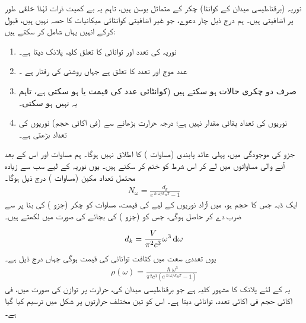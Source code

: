 
نوریہ   (برقناطیسی میدان کے کوانٹا)    چکر   کے متماثل بوسن  ہیں،  تاہم  یہ  بے کمیت ذرات لہٰذا   خلقی  طور پر اضافیتی ہیں۔  ہم درج ذیل چار دعوے،  جو غیر اضافیتی  کوانٹائی  میکانیات کا حصہ نہیں ہیں،   قبول کرکے انہیں یہاں شامل کر سکتے ہیں:
\begin{enumerate}[1.]
\item
  نوریہ کی تعدد اور توانائی کا تعلق کلیہ پلانک  دیتا ہے۔
\item  
     عدد موج   اور تعدد کا تعلق  ہے جہاں  روشنی کی رفتار ہے ۔
 \item
صرف دو       چکری حالات  ہو سکتے ہیں  (کوانٹائی  عدد  کی قیمت  یا    ہو سکتی ہے،  تاہم یہ    نہیں ہو سکتی۔
\item      
       نوریوں کی تعداد بقائی مقدار نہیں ہے؛  درجہ حرارت بڑھانے سے  (فی  اکائی حجم)  نوریوں کی تعداد بڑھتی ہے۔
\end{enumerate}     
  
         جزو   کی موجودگی میں،  پہلی عائد  پابندی  (مساوات  )   کا اطلاق  نہیں ہوگا۔  ہم مساوات    اور اس کے بعد  آنے والی مساواتوں میں  لے کر اس شرط  کو ختم  کر سکتے ہیں۔  یوں نوریہ کے لیے سب سے زیادہ محتمل تعداد مکین  (مساوات  )    درج ذیل ہوگا۔ 
\begin{align}
N_{\omega} = \frac{d_k}{e^{\hslash \omega / k_B T} - 1}
\end{align}
ایک ڈبہ جس کا حجم  ہو، میں آزاد نوریوں کے لیے  کی قیمت،  مساوات  کو  چکر (جزو  ) کی بنا پر   سے ضرب دے کر  حاصل ہوگی،  جس کو   (جزو  ) کی بجائے  کی صورت میں لکھتے ہیں۔ 

\begin{align} 
d_k = \frac{V}{\pi^2 c^3} \omega^3 \dif  \omega
\end{align}
یوں تعددی سعت   میں کثافت توانائی  کی قیمت  ہوگی جہاں  درج ذیل ہے۔
\begin{align}\label{مساوات_متماثل_سیاہ_جسمی_طیف}
\rho (\omega) = \frac{\hslash \omega^3}{\pi^2 c^3 (e^{\hslash \omega / k_B T} - 1)}
\end{align}
یہ   کے لئے پلانک کا مشہور کلیہ ہے جو برقناطیسی میدان کی،  حرارت  پر توازن کی صورت میں،  فی اکائی حجم فی اکائی تعدد،  توانائی دیتا ہے۔ اس کو تین مختلف حرارتوں پر شکل  میں ترسیم کیا گیا ہے۔ 

